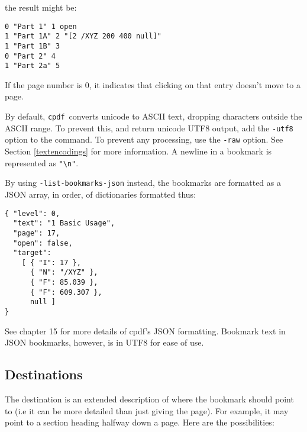 \documentclass{book}
\newcommand{\cpdf}{\texttt{cpdf}}
\begin{document}
\noindent the result might be:
\begin{framed}{\small\begin{verbatim}
0 "Part 1" 1 open
1 "Part 1A" 2 "[2 /XYZ 200 400 null]"
1 "Part 1B" 3
0 "Part 2" 4
1 "Part 2a" 5\end{verbatim}}\end{framed}
\noindent If the page number is 0, it indicates that clicking on that entry doesn't move to a page.

By default, \cpdf\ converts unicode to ASCII text, dropping characters outside
the ASCII range. To prevent this, and return unicode UTF8 output, add the
\texttt{-utf8} option to the command. To prevent any processing, use the
\texttt{-raw} option. See Section \ref{textencodings} for more information. A newline in a bookmark is represented as \texttt{"\textbackslash n"}.

By using \texttt{-list-bookmarks-json} instead, the bookmarks are formatted as a JSON array, in order, of dictionaries formatted thus:

\begin{verbatim}
{ "level": 0,
  "text": "1 Basic Usage",
  "page": 17,
  "open": false,
  "target":
    [ { "I": 17 },
      { "N": "/XYZ" },
      { "F": 85.039 },
      { "F": 609.307 },
      null ]
}
\end{verbatim}

See chapter 15 for more details of cpdf's JSON formatting. Bookmark text in JSON bookmarks, however, is in UTF8 for ease of use.

\subsection{Destinations}

The destination is an extended description of where the bookmark should point to (i.e it can be more detailed than just giving the page). For example, it may point to a section heading halfway down a page. Here are the possibilities:

\medskip
\end{document}
